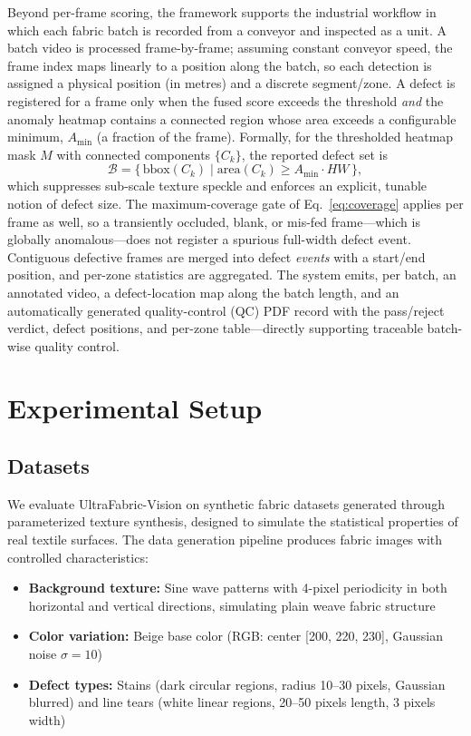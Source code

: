 \documentclass[journal]{IEEEtran}
\begin{document}
Beyond per-frame scoring, the framework supports the industrial workflow in which each fabric batch is recorded from a conveyor and inspected as a unit. A batch video is processed frame-by-frame; assuming constant conveyor speed, the frame index maps linearly to a position along the batch, so each detection is assigned a physical position (in metres) and a discrete segment/zone. A defect is registered for a frame only when the fused score exceeds the threshold \emph{and} the anomaly heatmap contains a connected region whose area exceeds a configurable minimum, $A_{\min}$ (a fraction of the frame). Formally, for the thresholded heatmap mask $M$ with connected components $\{C_k\}$, the reported defect set is
\begin{equation}
    \mathcal{B} = \{\, \text{bbox}(C_k) \;|\; \text{area}(C_k) \geq A_{\min}\cdot HW \,\},
    \label{eq:minsize}
\end{equation}
which suppresses sub-scale texture speckle and enforces an explicit, tunable notion of defect size. The maximum-coverage gate of Eq.~\ref{eq:coverage} applies per frame as well, so a transiently occluded, blank, or mis-fed frame---which is globally anomalous---does not register a spurious full-width defect event. Contiguous defective frames are merged into defect \emph{events} with a start/end position, and per-zone statistics are aggregated. The system emits, per batch, an annotated video, a defect-location map along the batch length, and an automatically generated quality-control (QC) PDF record with the pass/reject verdict, defect positions, and per-zone table---directly supporting traceable batch-wise quality control.

\section{Experimental Setup}
\label{sec:experiments}

\subsection{Datasets}

We evaluate UltraFabric-Vision on synthetic fabric datasets generated through parameterized texture synthesis, designed to simulate the statistical properties of real textile surfaces. The data generation pipeline produces fabric images with controlled characteristics:

\begin{itemize}[nosep]
    \item \textbf{Background texture:} Sine wave patterns with 4-pixel periodicity in both horizontal and vertical directions, simulating plain weave fabric structure
    \item \textbf{Color variation:} Beige base color (RGB: center [200, 220, 230], Gaussian noise $\sigma=10$)
    \item \textbf{Defect types:} Stains (dark circular regions, radius 10--30 pixels, Gaussian blurred) and line tears (white linear regions, 20--50 pixels length, 3 pixels width)
\end{itemize}
\end{document}
